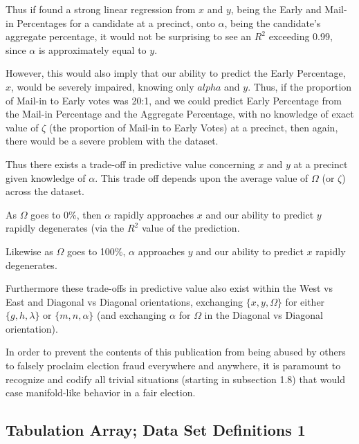 \documentclass[preprint,13pt]{elsarticle}
\begin{document}
Thus if found a strong linear regression from $x$ and $y$, being the Early and Mail-in Percentages for a candidate at a precinct, onto $\alpha$, being the candidate's aggregate percentage, it would not be surprising to see an $R^2$ exceeding 0.99, since $\alpha$ is approximately equal to $y$.

However, this would also imply that our ability to predict the Early Percentage, $x$, would be severely impaired, knowing only $alpha$ and $y$. Thus, if the proportion of Mail-in to Early votes was 20:1, and we could predict Early Percentage from the Mail-in Percentage and the Aggregate Percentage, with no knowledge of exact value of $\zeta$ (the proportion of Mail-in to Early Votes) at a precinct, then again, there would be a severe problem with the dataset.

Thus there exists a trade-off in predictive value concerning $x$ and $y$ at a precinct given knowledge of $\alpha$. This trade off depends upon the average value of $\Omega$ (or $\zeta$) across the dataset.  

As $\Omega$ goes to 0\%, then $\alpha$ rapidly approaches $x$ and our ability to predict $y$ rapidly degenerates (via the $R^2$ value of the prediction.

Likewise as $\Omega$ goes to 100\%, $\alpha$ approaches $y$ and our ability to predict $x$ rapidly degenerates.

Furthermore these trade-offs in predictive value also exist within the West vs East and Diagonal vs Diagonal orientations, exchanging $\{x,y,\Omega\}$ for either $\{g,h,\lambda\}$ or $\{m,n,\alpha\}$ (and exchanging $\alpha$ for $\Omega$ in the Diagonal vs Diagonal orientation).

In order to prevent the contents of this publication from being abused by others to falsely proclaim election fraud everywhere and anywhere, it is paramount to recognize and codify all trivial situations (starting in subsection 1.8) that would case manifold-like behavior in a fair election.
\newpage
\subsection{Tabulation Array; Data Set Definitions 1}
\end{document}
